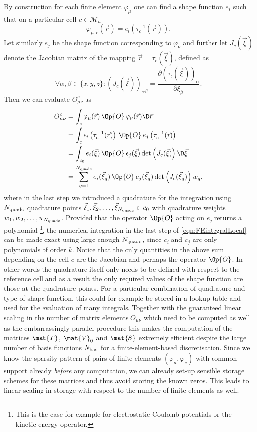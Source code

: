 By construction for each finite element
$\varphi_\mu$ one can find a shape function $e_i$
such that on a particular cell $c \in \mathcal{M}_h$
\[
	\varphi_\mu\big|_c(\vec{r}) = e_i\left( \tau_c^{-1}(\vec{r}) \right).
\]
Let similarly $e_j$ be the shape function corresponding to $\varphi_\nu$
and further let $J_c(\vec{\xi})$ denote the Jacobian matrix
of the mapping $\vec{r} = \tau_c(\vec{\xi})$,
defined as
\[
	\forall \alpha,\beta \in \{x,y,z\}:
	\left( J_c (\vec{\xi}) \right)_{\alpha\beta} = \frac{\partial \left( \tau_c(\vec{\xi})  \right)_\alpha}{\partial \xi_\beta}.
\]
Then we can evaluate $O^c_{\mu\nu}$ as
\begin{equation}
\begin{aligned}
	O^c_{\mu\nu} &= \int_c \varphi_\mu(\vec{r})\, \Op{O} \, \varphi_\nu(\vec{r}) \D\vec{r} \\
	&= \int_c e_i\left( \tau_c^{-1}(\vec{r}) \right) \, \Op{O} \,
		e_j\left( \tau_c^{-1}(\vec{r}) \right) \\
		&= \int_{c_0} e_i(\vec{\xi}) \, \Op{O} \, e_j(\vec{\xi}) \det\left( J_c(\vec{\xi}) \right) \D \vec{\xi} \\
	&= \sum_{q=1}^{\Nquadc} e_i(\vec{\xi}_q) \, \Op{O} \, e_j(\vec{\xi}_q) \det\left( J_c(\vec{\xi}_q) \right) w_q,
\end{aligned}
\label{eqn:FEintegralLocal}
\end{equation}
where in the last step we introduced a quadrature for the integration
using $N_\text{quadc}$ quadrature points
$\vec{\xi}_1, \vec{\xi}_2, \ldots, \vec{\xi}_{N_\text{quadc}} \in c_0$
with quadrature weights $w_1, w_2, \ldots, w_{N_\text{quadc}}$.
Provided that the operator $\Op{O}$ acting on $e_j$ returns a polynomial%
\footnote{This is the case for example for electrostatic Coulomb potentials
or the kinetic energy operator.},
the numerical integration in the last step of \eqref{eqn:FEintegralLocal}
can be made exact using large enough $N_\text{quadc}$,
since $e_i$ and $e_j$ are only polynomials of order $k$.
Notice that the only quantities in the above sum depending
on the cell $c$ are the Jacobian and perhaps the operator $\Op{O}$.
In other words the quadrature itself only needs to be defined
with respect to the reference cell
and as a result the only required values of the shape function are those
at the quadrature points.
For a particular combination of quadrature and type of shape function,
this could for example be stored in a lookup-table
and used for the evaluation of many integrals.
Together with the guaranteed linear scaling
in the number of matrix elements $O_{\mu\nu}$
which need to be computed
as well as the embarrassingly parallel procedure
this makes the computation of the matrices $\mat{T}$,
$\mat{V}_0$ and $\mat{S}$ extremely efficient despite
the large number of basis functions $N_\text{bas}$ for a
finite-element-based discretisation.
Since we know the sparsity pattern of
pairs of finite elements $(\varphi_\mu, \varphi_\nu)$
with common support
already \emph{before} any computation,
we can already set-up sensible storage schemes
for these matrices and thus avoid storing the known zeros.
This leads to linear scaling in storage with respect to the number
of finite elements as well.

